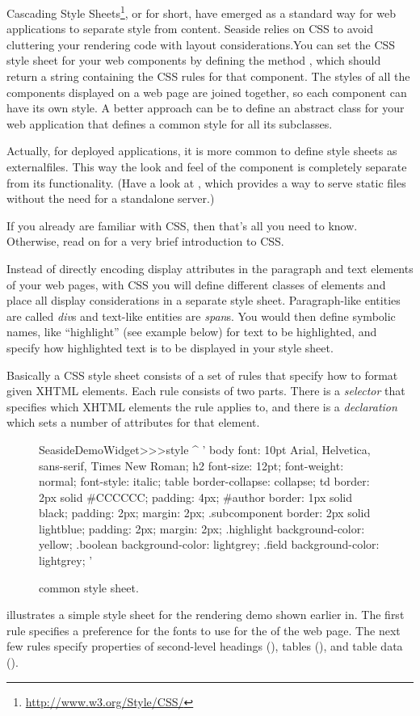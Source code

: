 \documentclass[a4paper,10pt,twoside]{book}
\begin{document}
Cascading Style Sheets\footnote{\url{http://www.w3.org/Style/CSS/}}, or  for
short, have emerged as a standard way for web applications to separate style from
content.
Seaside relies on CSS to avoid cluttering your rendering code with layout considerations.You can set the CSS style sheet for your web components by defining the method
, which should return a string containing the CSS rules for that component.
The styles of all the components displayed on a web page are joined together, so each
component can have its own style.
A better approach can be to define an abstract class for your web application that
defines a common style for all its subclasses.

Actually, for deployed applications, it is more common to define style sheets as externalfiles.
This way the look and feel of the component is completely separate from its
functionality.
(Have a look at , which provides a way to serve static files
without the need for a standalone server.)

If you already are familiar with CSS, then that's all you need to know.
Otherwise, read on for a very brief introduction to CSS.

Instead of directly encoding display attributes in the paragraph and text elements of
your web pages, with CSS you will define different classes of elements and place all
display considerations in a separate style sheet.
Paragraph-like entities are called \emph{div}s and text-like entities are \emph{span}s.
You would then define symbolic names, like ``highlight'' (see example below) for text to
be highlighted, and specify how highlighted text is to be displayed in your style sheet.

Basically a CSS style sheet consists of a set of rules that specify how to format given
XHTML elements.
Each rule consists of two parts.
There is a \emph{selector} that specifies which XHTML elements the rule applies to, and
there is a \emph{declaration} which sets a number of attributes for that element.

\begin{figure}[tb]
\begin{code}{}
SeasideDemoWidget>>>style
	^ '
body {
	font: 10pt Arial, Helvetica, sans-serif, Times New Roman;
}
h2 {
	font-size: 12pt;
	font-weight: normal;
	font-style: italic;
}
table { border-collapse: collapse; }
td {
	border: 2px solid #CCCCCC;
	padding: 4px;
}
#author {
	border: 1px solid black;
	padding: 2px;
	margin: 2px;
}
.subcomponent {
	border: 2px solid lightblue;
	padding: 2px;
	margin: 2px;
}
.highlight { background-color: yellow; }
.boolean { background-color: lightgrey; }
.field { background-color: lightgrey; }
'
\end{code}
\caption{ common style sheet.
}
\end{figure}
 illustrates a simple style sheet for the rendering demo shown earlier in.
The first rule specifies a preference for the fonts to use for the  of the web
page.
The next few rules specify properties of second-level headings (), tables
(), and table data ().
\end{document}
